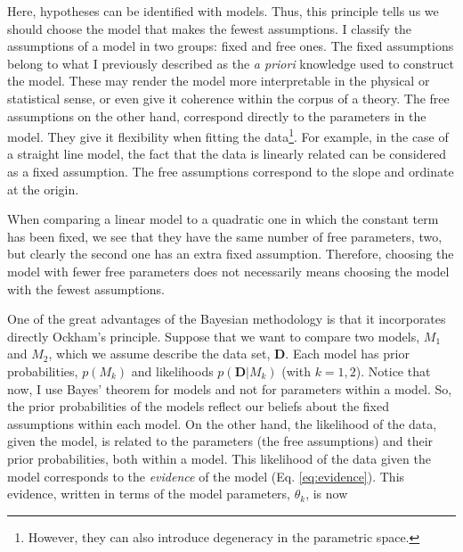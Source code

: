 Here, hypotheses can be identified with models. Thus, this principle tells us we should choose the model that makes the fewest assumptions. I classify the assumptions of a model in two groups: fixed and free ones. The fixed assumptions belong to what I previously described as the \emph{a priori} knowledge used to construct the model. These may render the model more interpretable in the physical or statistical sense, or even give it coherence within the corpus of a theory. The free assumptions on the other hand, correspond directly to the parameters in the model. They give it flexibility when fitting the data\footnote{However, they can also introduce degeneracy in the parametric space.}. For example, in the case of a straight line model, the fact that the data is linearly related can be considered as a fixed assumption. The free assumptions correspond to the slope and ordinate at the origin. 

When comparing a linear model to a quadratic one in which the constant term has been fixed, we see that they have the same number of free parameters, two, but clearly the second one has an extra fixed assumption. Therefore, choosing the model with fewer free parameters does not necessarily means choosing the model with the fewest assumptions.

One of the great advantages of the Bayesian methodology is that it incorporates directly Ockham's principle. Suppose that we want to compare two models, $M_1$ and $M_2$, which we assume describe the data set, $\mathbf{D}$. Each model has prior probabilities, $p(M_k)$ and likelihoods $p(\mathbf{D}|M_k)$ (with $k=1,2$). Notice that now, I use Bayes' theorem for models and not for parameters within a model. So, the prior probabilities of the models reflect our beliefs about the fixed assumptions within each model. On the other hand, the likelihood of the data, given the model, is related to the parameters (the free assumptions) and their prior probabilities, both within a model. This likelihood of the data given the model corresponds to the \emph{evidence} of the model (Eq. \ref{eq:evidence}). This evidence, written in terms of the model parameters, $\theta_k$, is now

